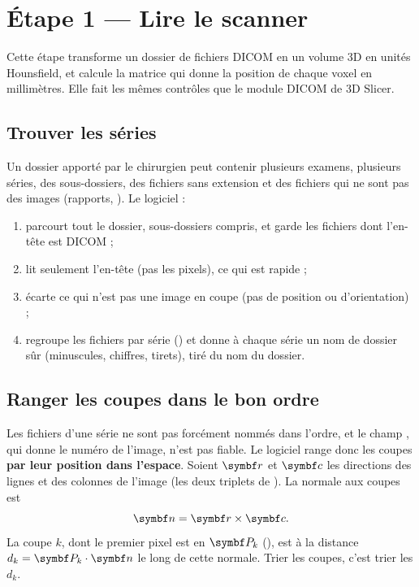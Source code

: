 \chapter{Étape 1 — Lire le scanner}
\label{chap:lecture}

\begin{chapeau}
Cette étape transforme un dossier de fichiers DICOM en un volume 3D en unités Hounsfield, et calcule la matrice qui
donne la position de chaque voxel en millimètres. Elle fait les mêmes contrôles que le module DICOM de 3D Slicer.
\end{chapeau}

\section{Trouver les séries}

Un dossier apporté par le chirurgien peut contenir plusieurs examens, plusieurs séries, des sous-dossiers, des
fichiers sans extension et des fichiers qui ne sont pas des images (rapports, ). Le logiciel :
\begin{enumerate}
  \item parcourt tout le dossier, sous-dossiers compris, et garde les fichiers dont l'en-tête est DICOM ;
  \item lit seulement l'en-tête (pas les pixels), ce qui est rapide ;
  \item écarte ce qui n'est pas une image en coupe (pas de position ou d'orientation) ;
  \item regroupe les fichiers par série () et donne à chaque série un nom de dossier sûr
  (minuscules, chiffres, tirets), tiré du nom du dossier.
\end{enumerate}

\section{Ranger les coupes dans le bon ordre}

Les fichiers d'une série ne sont pas forcément nommés dans l'ordre, et le champ , qui donne
le numéro de l'image, n'est pas fiable. Le logiciel range donc les coupes \textbf{par leur position dans l'espace}. Soient $\vb{r}$ et
$\vb{c}$ les directions des lignes et des colonnes de l'image (les deux triplets de ).
La normale aux coupes est
\begin{equation}
  \vb{n} = \vb{r} \times \vb{c}.
\end{equation}
La coupe $k$, dont le premier pixel est en $\vb{P}_k$ (), est à la distance
$d_k = \vb{P}_k \cdot \vb{n}$ le long de cette normale. Trier les coupes, c'est trier les $d_k$.

